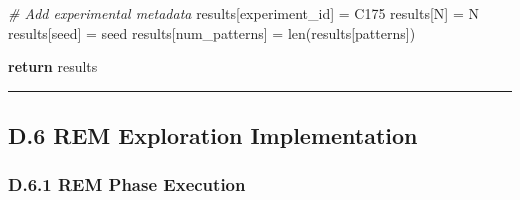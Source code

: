 \documentclass[
]{article}
\newenvironment{Shaded}{}{}
\newcommand{\BuiltInTok}[1]{\textcolor[rgb]{0.00,0.50,0.00}{#1}}
\newcommand{\CommentTok}[1]{\textcolor[rgb]{0.38,0.63,0.69}{\textit{#1}}}
\newcommand{\ControlFlowTok}[1]{\textcolor[rgb]{0.00,0.44,0.13}{\textbf{#1}}}
\newcommand{\NormalTok}[1]{#1}
\newcommand{\OperatorTok}[1]{\textcolor[rgb]{0.40,0.40,0.40}{#1}}
\newcommand{\StringTok}[1]{\textcolor[rgb]{0.25,0.44,0.63}{#1}}
\begin{document}
\begin{Shaded}
\begin{Highlighting}[]
    \CommentTok{\# Add experimental metadata}
\NormalTok{    results[}\StringTok{\textquotesingle{}experiment\_id\textquotesingle{}}\NormalTok{] }\OperatorTok{=} \StringTok{\textquotesingle{}C175\textquotesingle{}}
\NormalTok{    results[}\StringTok{\textquotesingle{}N\textquotesingle{}}\NormalTok{] }\OperatorTok{=}\NormalTok{ N}
\NormalTok{    results[}\StringTok{\textquotesingle{}seed\textquotesingle{}}\NormalTok{] }\OperatorTok{=}\NormalTok{ seed}
\NormalTok{    results[}\StringTok{\textquotesingle{}num\_patterns\textquotesingle{}}\NormalTok{] }\OperatorTok{=} \BuiltInTok{len}\NormalTok{(results[}\StringTok{\textquotesingle{}patterns\textquotesingle{}}\NormalTok{])}

    \ControlFlowTok{return}\NormalTok{ results}
\end{Highlighting}
\end{Shaded}

\begin{center}\rule{0.5\linewidth}{0.5pt}\end{center}

\subsection{D.6 REM Exploration
Implementation}\label{d.6-rem-exploration-implementation}

\subsubsection{D.6.1 REM Phase
Execution}\label{d.6.1-rem-phase-execution}
\end{document}
